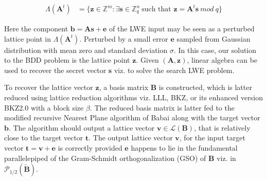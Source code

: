 \begin{align*}
    \Lambda(\textbf{A}^t) & = \{ \textbf{z} \in \mathbb{Z}^m : \exists \textbf{s} \in \mathbb{Z}^n_q \ \text{such  that } \textbf{z}=\textbf{A}^t\textbf{s}\ mod\ q \}
\end{align*}

Here the component $\textbf{b}=\textbf{As}+\textbf{e}$ of the LWE input may be seen as a perturbed lattice point in $\Lambda(\textbf{A}^t)$. Perturbed by a small error $\textbf{e}$ sampled from Gaussian distribution with mean zero and standard deviation $\sigma$. In this case, our solution to the BDD problem is the lattice point $\textbf{z}$. Given $(\textbf{A},\textbf{z})$, linear algebra can be used to recover the secret vector $\textbf{s}$ viz. to solve the search LWE problem.

To recover the lattice vector $\textbf{z}$, a basis matrix $\textbf{B}$ is constructed, which is latter reduced using lattice reduction algorithms viz. LLL, BKZ, or its enhanced version BKZ2.0 with a  block size $\beta$. The reduced basis matrix is latter fed to the modified recursive Nearest Plane algorithm of Babai \cite{babai1986lovasz} along with the target vector $\textbf{b}$. The algorithm should output a lattice vector $\textbf{v} \in \mathcal{L}(\textbf{B})$, that is relatively close to the target vector $\textbf{t}$. The output lattice vector $\textbf{v}$, for the input target vector $\textbf{t}=\textbf{v}+\textbf{e}$ is correctly provided $\textbf{e}$  happens to lie in the fundamental parallelepiped of the Gram-Schmidt orthogonalization (GSO) of $\textbf{B}$ viz. in $\mathcal{P}_{1/2}(\tilde{\textbf{B}})$.

